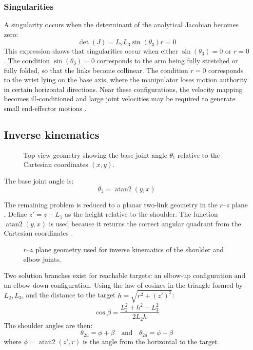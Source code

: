\documentclass[12pt,a4paper]{article}
\begin{document}
\subsubsection*{Singularities}
A singularity occurs when the determinant of the analytical Jacobian becomes zero:
\[ \det(J) = L_2 L_3 \sin(\theta_3) r = 0 \]
This expression shows that singularities occur when either $\sin(\theta_3) = 0$ or $r = 0$. The condition $\sin(\theta_3) = 0$ corresponds to the arm being fully stretched or fully folded, so that the links become collinear. The condition $r = 0$ corresponds to the wrist lying on the base axis, where the manipulator loses motion authority in certain horizontal directions. Near these configurations, the velocity mapping becomes ill-conditioned and large joint velocities may be required to generate small end-effector motions \cite{siciliano2009, spong2006}.

\subsection{Inverse kinematics}

\begin{figure}[H]
    \centering
    
    \caption{Top-view geometry showing the base joint angle $\theta_1$ relative to the Cartesian coordinates $(x, y)$.}
\end{figure}

The base joint angle is:
\[ \theta_1 = \operatorname{atan2}(y, x) \]

The remaining problem is reduced to a planar two-link geometry in the $r$--$z$
plane \cite{craig2005}. Define $z' = z - L_1$ as the height relative to the
shoulder. The function $\operatorname{atan2}(y,x)$ is used because
it returns the correct angular quadrant from the Cartesian coordinates
\cite{mathworks2023atan2}. 

\begin{figure}[H]
    \centering
    
    \caption{$r$--$z$ plane geometry used for inverse kinematics of the shoulder and elbow joints.}
\end{figure}

Two solution branches exist for reachable targets: an elbow-up configuration and
an elbow-down configuration. Using the law of cosines in the triangle formed by
$L_2, L_3$, and the distance to the target $h = \sqrt{r^2 + (z')^2}$:
\begin{equation}
    \cos \beta = \frac{L_2^2 + h^2 - L_3^2}{2 L_2 h}
\end{equation}
The shoulder angles are then:
\[ \theta_{2u} = \phi + \beta \quad \text{and} \quad \theta_{2d} = \phi - \beta \]
where $\phi = \operatorname{atan2}(z', r)$ is the angle from the horizontal to the target.
\end{document}
